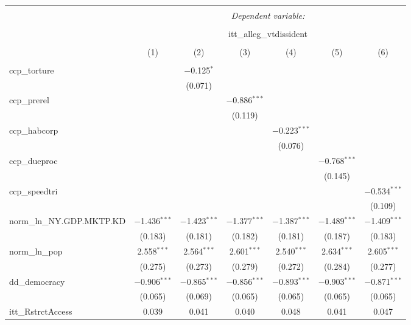 
\begin{sidewaystable}[!htbp] \centering 
  \caption{} 
  \label{} 
\tiny 
\begin{tabular}{@{\extracolsep{5pt}}lcccccc} 
\\[-1.8ex]\hline 
\hline \\[-1.8ex] 
 & \multicolumn{6}{c}{\textit{Dependent variable:}} \\ 
\cline{2-7} 
\\[-1.8ex] & \multicolumn{6}{c}{itt\_alleg\_vtdissident} \\ 
\\[-1.8ex] & (1) & (2) & (3) & (4) & (5) & (6)\\ 
\hline \\[-1.8ex] 
 ccp\_torture &  & $-$0.125$^{*}$ &  &  &  &  \\ 
  &  & (0.071) &  &  &  &  \\ 
  ccp\_prerel &  &  & $-$0.886$^{***}$ &  &  &  \\ 
  &  &  & (0.119) &  &  &  \\ 
  ccp\_habcorp &  &  &  & $-$0.223$^{***}$ &  &  \\ 
  &  &  &  & (0.076) &  &  \\ 
  ccp\_dueproc &  &  &  &  & $-$0.768$^{***}$ &  \\ 
  &  &  &  &  & (0.145) &  \\ 
  ccp\_speedtri &  &  &  &  &  & $-$0.534$^{***}$ \\ 
  &  &  &  &  &  & (0.109) \\ 
  norm\_ln\_NY.GDP.MKTP.KD & $-$1.436$^{***}$ & $-$1.423$^{***}$ & $-$1.377$^{***}$ & $-$1.387$^{***}$ & $-$1.489$^{***}$ & $-$1.409$^{***}$ \\ 
  & (0.183) & (0.181) & (0.182) & (0.181) & (0.187) & (0.183) \\ 
  norm\_ln\_pop & 2.558$^{***}$ & 2.564$^{***}$ & 2.601$^{***}$ & 2.540$^{***}$ & 2.634$^{***}$ & 2.605$^{***}$ \\ 
  & (0.275) & (0.273) & (0.279) & (0.272) & (0.284) & (0.277) \\ 
  dd\_democracy & $-$0.906$^{***}$ & $-$0.865$^{***}$ & $-$0.856$^{***}$ & $-$0.893$^{***}$ & $-$0.903$^{***}$ & $-$0.871$^{***}$ \\ 
  & (0.065) & (0.069) & (0.065) & (0.065) & (0.065) & (0.065) \\ 
  itt\_RstrctAccess & 0.039 & 0.041 & 0.040 & 0.048 & 0.041 & 0.047 \\ 

\end{tabular}
\end{sidewaystable}
